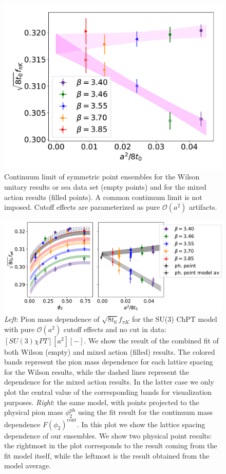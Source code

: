 \begin{figure}
    \centering
    \includegraphics[width=.7\textwidth]{./cap5/figs/continuum_sym.pdf}
    \caption{Continuum limit of symmetric point ensembles for the Wilson unitary results or sea data set (empty points) and for the mixed action results (filled points). A common continuum limit is not imposed. Cutoff effects are parameterized as pure $\mathcal{O}(a^2)$ artifacts.}
    \label{ch_ss:fig:universality}
\end{figure}

\begin{figure}
    \centering
    \includegraphics[width=1.\textwidth]{./cap5/figs/SU3_comb.pdf}
    \caption{\textit{Left}: Pion mass dependence of $\sqrt{8t_0}f_{\pi K}$ for the SU(3) ChPT model with pure $\mathcal{O}(a^2)$ cutoff effects and no cut in data: $[SU(3)\chi PT][a^2][-]$. We show the result of the combined fit of both Wilson (empty) and mixed action (filled) results. The colored bands represent the pion mass dependence for each lattice spacing for the Wilson results, while the dashed lines represent the dependence for the mixed action results. In the latter case we only plot the central value of the corresponding bands for visualization purposes. \textit{Right}: the same model, with points projected to the physical pion mass $\phi_2^{\textrm{ph}}$ using the fit result for the continuum mass dependence $F(\phi_2)^{\textrm{cont}}$. In this plot we show the lattice spacing dependence of our ensembles. We show two physical point results: the rightmost in the plot corresponds to the result coming from the fit model itself, while the leftmost is the result obtained from the model average.}
    \label{ch_ss:fig:SU3a2}
\end{figure}

